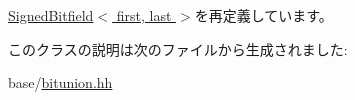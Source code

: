 \hyperlink{classBitfieldBackend_1_1SignedBitfieldTypes_1_1SignedBitfield_aa9c1202c4f5162c5214e708c80d5d4c8}{SignedBitfield$<$ first, last $>$}を再定義しています。

このクラスの説明は次のファイルから生成されました:\begin{DoxyCompactItemize}
\item 
base/\hyperlink{bitunion_8hh}{bitunion.hh}\end{DoxyCompactItemize}
